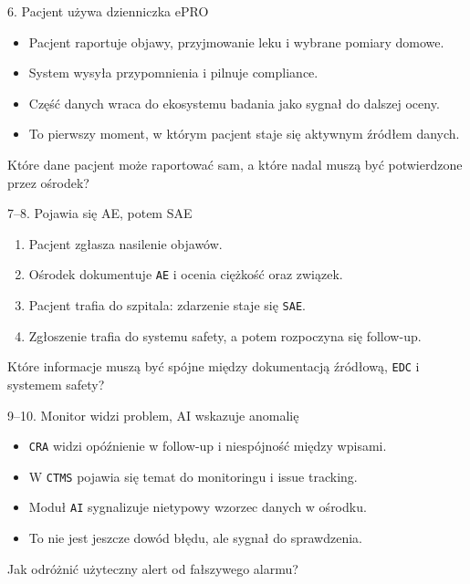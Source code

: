 \begin{frame}{6. Pacjent używa dzienniczka ePRO}
  \begin{itemize}
    \item Pacjent raportuje objawy, przyjmowanie leku i wybrane pomiary domowe.
    \item System wysyła przypomnienia i pilnuje compliance.
    \item Część danych wraca do ekosystemu badania jako sygnał do dalszej oceny.
    \item To pierwszy moment, w którym pacjent staje się aktywnym źródłem danych.
  \end{itemize}
  \begin{QuestionBox}
    Które dane pacjent może raportować sam, a które nadal muszą być potwierdzone przez ośrodek?
  \end{QuestionBox}
\end{frame}

\begin{frame}{7--8. Pojawia się AE, potem SAE}
  \begin{enumerate}
    \item Pacjent zgłasza nasilenie objawów.
    \item Ośrodek dokumentuje \texttt{AE} i ocenia ciężkość oraz związek.
    \item Pacjent trafia do szpitala: zdarzenie staje się \texttt{SAE}.
    \item Zgłoszenie trafia do systemu safety, a potem rozpoczyna się follow-up.
  \end{enumerate}
  \begin{QuestionBox}
    Które informacje muszą być spójne między dokumentacją źródłową, \texttt{EDC} i systemem safety?
  \end{QuestionBox}
\end{frame}

\begin{frame}{9--10. Monitor widzi problem, AI wskazuje anomalię}
  \begin{itemize}
    \item \texttt{CRA} widzi opóźnienie w follow-up i niespójność między wpisami.
    \item W \texttt{CTMS} pojawia się temat do monitoringu i issue tracking.
    \item Moduł \texttt{AI} sygnalizuje nietypowy wzorzec danych w ośrodku.
    \item To nie jest jeszcze dowód błędu, ale sygnał do sprawdzenia.
  \end{itemize}
  \begin{QuestionBox}
    Jak odróżnić użyteczny alert od fałszywego alarmu?
  \end{QuestionBox}
\end{frame}

